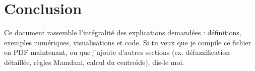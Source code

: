 \documentclass[a4paper,11pt]{article}
\begin{document}
\section*{Conclusion}
Ce document rassemble l'intégralité des explications demandées : définitions, exemples numériques, visualisations et code. Si tu veux que je compile ce fichier en PDF maintenant, ou que j'ajoute d'autres sections (ex. défuzzification détaillée, règles Mamdani, calcul du centroïde), dis-le moi.
\end{document}
